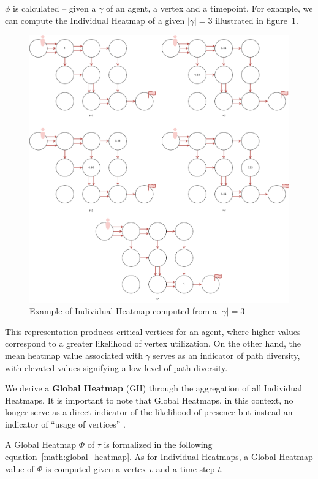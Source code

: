 \(\phi\) is calculated --  given a \(\gamma\) of an agent, a vertex and a timepoint. For example, we can compute the Individual Heatmap of a given \(|\gamma|=3\) illustrated in figure~\ref{fig:individual_heatmap}.

\begin{figure}[H]
    \centering
    \caption{Example of Individual Heatmap computed from a \(|\gamma|=3\)}\label{fig:individual_heatmap}
    \includegraphics[width=\widthimg]{img/individual_heatmap.drawio.png}
\end{figure}

This representation produces critical vertices for an agent, where higher values correspond to a greater likelihood of vertex utilization. On the other hand, the mean heatmap value associated with \(\gamma\) serves as an indicator of path diversity, with elevated values signifying a low level of path diversity.

We derive a \textbf{Global Heatmap} (GH) through the aggregation of all Individual Heatmaps. It is important to note that Global Heatmaps, in this context, no longer serve as a direct indicator of the likelihood of presence but instead an indicator of ``usage of vertices'' .

A Global Heatmap \(\Phi\) of \(\tau\) is formalized in the following equation~\ref{math:global_heatmap}. As for Individual Heatmaps, a Global Heatmap value of \(\Phi\) is computed given a vertex \(v\) and a time step \(t\).  

